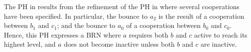 \begin{example}
The PH in  results from the refinement of the PH in 
where several cooperations have been specified.
In particular, the bounce to $a_2$ is the result of a cooperation between $b_1$ and $c_1$; and the
bounce to $a_0$ of a cooperation between $b_0$ and $c_0$.
Hence, this PH expresses a BRN where $a$ requires both $b$ and $c$ active to reach its
highest level, and $a$ does not become inactive unless both $b$ and $c$ are inactive.
\end{example}

